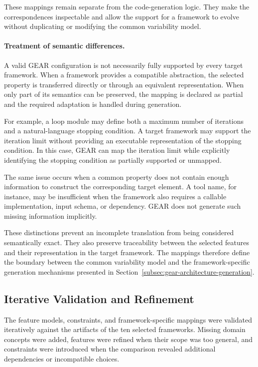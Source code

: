 These mappings remain separate from the code-generation logic. They make the
correspondences inspectable and allow the support for a framework to evolve
without duplicating or modifying the common variability model.


\paragraph{\textbf{Treatment of semantic differences.}}
A valid GEAR configuration is not necessarily fully supported by every target
framework. When a framework provides a compatible abstraction, the selected
property is transferred directly or through an equivalent representation. When
only part of its semantics can be preserved, the mapping is declared as partial
and the required adaptation is handled during generation.

For example, a loop module may define both a maximum number of iterations and a
natural-language stopping condition. A target framework may support the
iteration limit without providing an executable representation of the stopping
condition. In this case, GEAR can map the iteration limit while explicitly
identifying the stopping condition as partially supported or unmapped.

The same issue occurs when a common property does not contain enough information
to construct the corresponding target element. A tool name, for instance, may
be insufficient when the framework also requires a callable implementation,
input schema, or dependency. GEAR does not generate such missing information
implicitly.

These distinctions prevent an incomplete translation from being considered
semantically exact. They also preserve traceability between the selected
features and their representation in the target framework. The mappings
therefore define the boundary between the common variability model and the
framework-specific generation mechanisms presented in
Section~\ref{subsec:gear-architecture-generation}.

\subsection{Iterative Validation and Refinement}
\label{subsec:iterative-validation-refinement}

The feature models, constraints, and framework-specific mappings were validated
iteratively against the artifacts of the ten selected frameworks. Missing
domain concepts were added, features were refined when their scope was too
general, and constraints were introduced when the comparison revealed
additional dependencies or incompatible choices.

